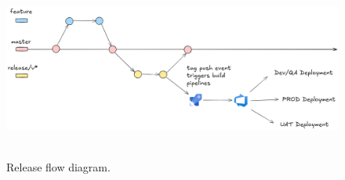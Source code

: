 ﻿\begin{figure}[H]
    \centering
    \includegraphics[width=1\textwidth]{img/Release_Flow}
    ~\caption{Release flow diagram.}\label{fig:gitlab-flow}
\end{figure}
